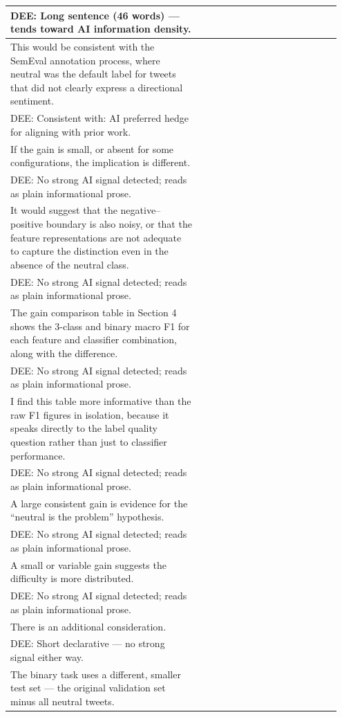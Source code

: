 \documentclass[11pt]{article}
\begin{document}
\begin{longtable}{|p{0.55\linewidth}|p{0.40\linewidth}|}
\hline
DEE: Long sentence (46 words) --- tends toward AI information density. & \\
\hline
This would be consistent with the SemEval annotation process, where neutral was the default label for tweets that did not clearly express a directional sentiment. & \\[2pt]
\hline
DEE: Consistent with: AI preferred hedge for aligning with prior work. & \\
\hline
If the gain is small, or absent for some configurations, the implication is different. & \\[2pt]
\hline
DEE: No strong AI signal detected; reads as plain informational prose. & \\
\hline
It would suggest that the negative--positive boundary is also noisy, or that the feature representations are not adequate to capture the distinction even in the absence of the neutral class. & \\[2pt]
\hline
DEE: No strong AI signal detected; reads as plain informational prose. & \\
\hline
The gain comparison table in Section 4 shows the 3-class and binary macro F1 for each feature and classifier combination, along with the difference. & \\[2pt]
\hline
DEE: No strong AI signal detected; reads as plain informational prose. & \\
\hline
I find this table more informative than the raw F1 figures in isolation, because it speaks directly to the label quality question rather than just to classifier performance. & \\[2pt]
\hline
DEE: No strong AI signal detected; reads as plain informational prose. & \\
\hline
A large consistent gain is evidence for the ``neutral is the problem'' hypothesis. & \\[2pt]
\hline
DEE: No strong AI signal detected; reads as plain informational prose. & \\
\hline
A small or variable gain suggests the difficulty is more distributed. & \\[2pt]
\hline
DEE: No strong AI signal detected; reads as plain informational prose. & \\
\hline
There is an additional consideration. & \\[2pt]
\hline
DEE: Short declarative --- no strong signal either way. & \\
\hline
The binary task uses a different, smaller test set --- the original validation set minus all neutral tweets. & \\[2pt]

\end{longtable}
\end{document}
